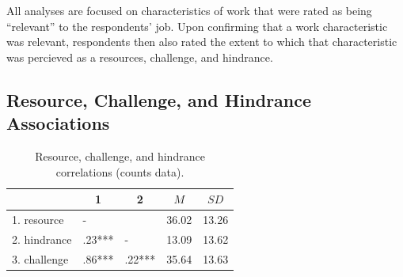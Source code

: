 \documentclass[
  man]{apa6}
\begin{document}
All analyses are focused on characteristics of work that were rated as being ``relevant'' to the respondents' job. Upon confirming that a work characteristic was relevant, respondents then also rated the extent to which that characteristic was percieved as a resources, challenge, and hindrance.

\hypertarget{resource-challenge-and-hindrance-associations}{%
\subsection{Resource, Challenge, and Hindrance Associations}\label{resource-challenge-and-hindrance-associations}}

\begin{table}[tbp]

\begin{center}
\begin{threeparttable}

\caption{\label{tab:cortab}Resource, challenge, and hindrance correlations (counts data).}

\begin{tabular}{lllll}
\toprule
 & \multicolumn{1}{c}{1} & \multicolumn{1}{c}{2} & \multicolumn{1}{c}{$M$} & \multicolumn{1}{c}{$SD$}\\
\midrule
1. resource & - &  & 36.02 & 13.26\\
2. hindrance & .23*** & - & 13.09 & 13.62\\
3. challenge & .86*** & .22*** & 35.64 & 13.63\\
\bottomrule
\end{tabular}

\end{threeparttable}
\end{center}

\end{table}
\end{document}
